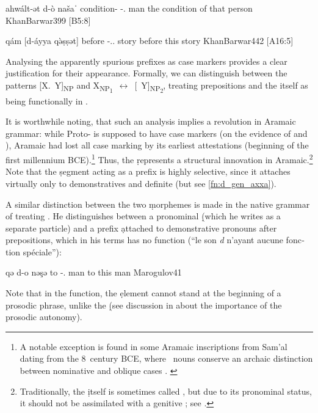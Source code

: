 \newpage

{ahwált-ət d-ò našaˈ}
{condition-\cst{} \gen-.\masc{} man}
{the condition of that person}
{KhanBarwar}{399 {[B5:8]}}

{qám [d-áyya qə̀ṣṣət]}
{before \gen-\dem.\near.\fem{} story{} }
{before this story}
{KhanBarwar}{442 {[A16:5]}}

 Analysing the apparently spurious \d prefixes as \gen* case markers provides a clear justification for their appearance. Formally, we can distinguish between the patterns [X.\cst\ \dgen Y]\textsubscript{NP} and \mbox{X\textsubscript{NP\textsubscript{1}} $\leftrightarrow$ [\dlnk\  Y]\textsubscript{NP\textsubscript{2}}}, treating prepositions and the \lnk* itself as being functionally in \cst*. 
 
 
 It is worthwhile noting, that such an analysis implies a revolution in Aramaic grammar: while Proto- is supposed to have case markers (on the evidence of  and \CArab), Aramaic had lost all case marking by its earliest attestations (beginning of the first millennium BCE).\footnote{A notable exception is found in some Aramaic inscriptions from Sam'al dating from the 8\th\ century BCE, where \mpl\ nouns conserve an archaic distinction between nominative and oblique cases \citep[117]{Dion}. \label{ft:gen_Samal}} Thus, the \gen* \d represents a structural innovation in Aramaic.\footnote{Traditionally, the \lnk* \d itself is sometimes called , but due to its pronominal status, it should not be assimilated with a genitive ; see \citet[253, fn.\ 27]{GoldenbergSemitic}.} Note that the \d segment acting as a \gen* prefix is highly selective, since it attaches virtually only to demonstratives and definite  (but see \vref{fn:d_gen_axxa}).

A similar distinction between the two \d morphemes is made in the native grammar of \citet[41f.]{Marogulov} treating \CUrm. He distinguishes between a pronominal \d (which he writes as a separate particle) and a prefix \d attached to demonstrative pronouns after prepositions, which in his terms has no function (\foreignquote{french}{le son \textit{d} n'ayant aucune fonction spéciale}):

{qə d-o nəşə}
{to \gen-\dem.\masc{} man}
{to this man}
{Marogulov}{41}

\newpage 
Note that in the \gen* function, the \d element cannot stand at the beginning of a prosodic phrase, unlike the \lnk* \d  (see discussion in  about the importance of the prosodic autonomy). 

